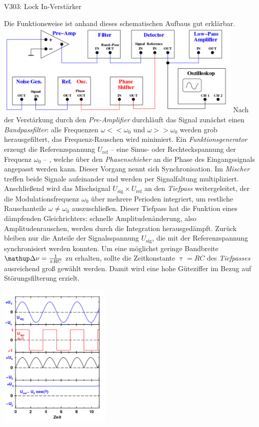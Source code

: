 \begin{Versuch}{V303: Lock In-Verstärker}
\begin{Theorie}
    	Die Funktionsweise ist anhand dieses schematischen Aufbaus gut erklärbar. 
    	\centering
    	\includegraphics[width=0.9\textwidth]{build/Bilder/LockIn.pdf}
    	\flushleft
    	Nach der Verstärkung durch den \emph{Pre-Amplifier} durchläuft das Signal zunächst einen \emph{Bandpassfilter}:
		alle Frequenzen $\omega<<\omega_0$ und $\omega>>\omega_0$ werden grob herausgefiltert, das Frequenz-Rauschen wird minimiert. 
		Ein \emph{Funktionsgenerator} erzeugt die Referenzspannung $U_\mathup{ref}$ -- eine Sinus- oder Rechteckspannung der Frequenz $\omega_0$ -- , welche über den \emph{Phasenschieber} an die Phase des Eingangssignals angepasst werden kann. 
		Dieser Vorgang nennt sich Synchronisation.
		Im \emph{Mischer} treffen beide Signale aufeinander und werden per Signalfaltung multipliziert. 
		Anschließend wird das Mischsignal $U_\mathup{sig}\times U_\mathup{ref}$ an den \emph{Tiefpass} weitergeleitet, der die Modulationsfrequenz $\omega_0$ über mehrere Perioden integriert, um restliche Rauschanteile $\omega\neq\omega_0$ auszuschließen. 
		Dieser Tiefpass hat die Funktion eines dämpfenden Gleichrichters: schnelle Amplitudenänderung, also Amplitudenrauschen, werden durch die Integration herausgedämpft.
		Zurück bleiben nur die Anteile der Signalsspannung $U_\mathup{sig}$, die mit der Referenzspannung synchronisiert werden konnten.
		Um eine möglichst geringe Bandbreite $\upD{\nu}=\frac{1}{\pi RC}$ zu erhalten, sollte die Zeitkonstante $\uptau=RC$ des \emph{Tiefpasses} ausreichend groß gewählt werden. 
		Damit wird eine hohe Güteziffer im Bezug auf Störungsfilterung erzielt.

		\centering
    	\includegraphics[width=0.4\textwidth]{build/Bilder/Signal.pdf}
    	\flushleft


\end{Theorie}
\end{Versuch}
